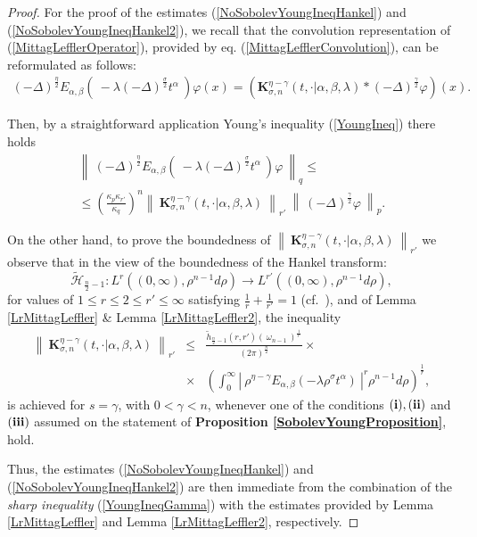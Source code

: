 \documentclass{amsart}
\theoremstyle{definition}
\theoremstyle{remark}
\numberwithin{equation}{section}
\begin{document}
\begin{proof}
	
	For the proof of the estimates (\ref{NoSobolevYoungIneqHankel}) and (\ref{NoSobolevYoungIneqHankel2}), we recall that the convolution representation of (\ref{MittagLefflerOperator}), provided by eq. (\ref{MittagLefflerConvolution}), can be reformulated as follows:
	\begin{eqnarray*}
		\label{MittagLefflerConvolutionSobolev}
		(-\Delta)^{\frac{\eta}{2}}E_{\alpha,\beta}\left(~-\lambda(-\Delta)^{\frac{\sigma}{2}} t^\alpha~\right)\varphi(x)=\displaystyle \left({\bm K}_{\sigma,n}^{\eta-\gamma}(t,\cdot|\alpha,\beta,\lambda)\ast (-\Delta)^{\frac{\gamma}{2}}\varphi\right)(x).
	\end{eqnarray*}
	
	Then, by a straightforward application Young's inequality (\ref{YoungIneq}) there holds
	\begin{eqnarray}
		\label{YoungIneqGamma}
		\left\|~ (-\Delta)^{\frac{\eta}{2}}E_{\alpha,\beta}\left(~-\lambda(-\Delta)^{\frac{\sigma}{2}} t^\alpha~\right)\varphi~\right\|_q \leq \nonumber \\ \leq \left(\frac{\kappa_p\kappa_{r'}}{\kappa_q}\right)^n \left\| ~{\bm K}_{\sigma,n}^{\eta-\gamma}(t,\cdot|\alpha,\beta,\lambda)~\right\|_{r'}~\left\|~(-\Delta)^{\frac{\gamma}{2}}\varphi~\right\|_p.
	\end{eqnarray}
	
	On the other hand, to prove the boundedness of $\left\| ~{\bm K}_{\sigma,n}^{\eta-\gamma}(t,\cdot|\alpha,\beta,\lambda)~\right\|_{r'}$
	we observe that in the view of the boundedness of the Hankel transform: $$\widetilde{\mathcal{H}}_{\frac{n}{2}-1}:L^r((0,\infty),\rho^{n-1}d\rho)\rightarrow L^{r'}((0,\infty),\rho^{n-1}d\rho),$$  for values of $1\leq r\leq 2\leq r'\leq \infty$ satisfying $\displaystyle \frac{1}{r}+\frac{1}{r'}=1$ (cf.~\cite[Proposition 2.1.]{DeCarli08}), and of Lemma \ref{LrMittagLeffler} \& Lemma \ref{LrMittagLeffler2}, the inequality 
	\begin{eqnarray*}
		\left\| ~{\bm K}_{\sigma,n}^{\eta-\gamma}(t,\cdot|\alpha,\beta,\lambda)~\right\|_{r'}&\leq& \frac{\widetilde{h}_{\frac{n}{2}-1}(r,r')\left(~\omega_{n-1}~\right)^{\frac{1}{r'}}}{(2\pi)^{\frac{n}{2}}}\times\\
		&\times&\left(\int_0^\infty\left|~\rho^{\eta-\gamma}E_{\alpha,\beta}(-\lambda \rho^\sigma t^{\alpha})~\right|^{r}\rho^{n-1}d\rho\right)^{\frac{1}{r}},
	\end{eqnarray*}
	is achieved for $s=\gamma$, with $0<\gamma<n$, whenever one of the conditions ${\bf (i)},{\bf (ii)}$ and ${\bf (iii)}$ assumed on the statement of {\bf Proposition \ref{SobolevYoungProposition}}, hold.
	
	Thus, the estimates (\ref{NoSobolevYoungIneqHankel}) and (\ref{NoSobolevYoungIneqHankel2}) are then immediate from the combination of the {\it sharp inequality} (\ref{YoungIneqGamma}) with the estimates provided by Lemma \ref{LrMittagLeffler} and Lemma \ref{LrMittagLeffler2}, respectively.
\end{proof}
\end{document}
